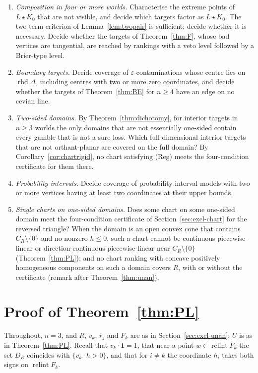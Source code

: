 \documentclass[11pt]{article}
\newcommand{\one}{\mathbf{1}}
\DeclareMathOperator{\conv}{conv}
\DeclareMathOperator{\relint}{relint}
\DeclareMathOperator{\rbd}{rbd}
\theoremstyle{plain}
\theoremstyle{definition}
\theoremstyle{remark}
\begin{document}
\begin{enumerate}[label=(\arabic*)]
  and $\conv\{\frac1{11}(6,4,1),\frac1{10}(6,1,3),\frac18(6,1,1)\}$, with two.
  \item \emph{Composition in four or more worlds.} Characterise the extreme points of
  $L\star K_0$ that are not visible, and decide which targets factor as $L\star K_0$. The
  two-term criterion of Lemma~\ref{lem:twopair} is sufficient; decide whether it is
  necessary. Decide
  whether the targets of Theorem~\ref{thm:F}, whose bad vertices are tangential, are
  reached by rankings with a veto level followed by a Brier-type level.
  \item \emph{Boundary targets.} Decide coverage of $\varepsilon$-contaminations whose centre
  lies on $\rbd\Delta$, including centres with two or more zero coordinates, and decide
  whether the targets of Theorem~\ref{thm:BE} for $n\ge4$ have an edge on no cevian line.
  \item \emph{Two-sided domains.} By Theorem~\ref{thm:dichotomy}, for interior targets in
  $n\ge3$ worlds the only domains that are not essentially one-sided contain every gamble
  that is not a sure loss. Which full-dimensional interior targets
  that are not orthant-planar are covered on the full domain? By
  Corollary~\ref{cor:chartrigid}, no chart satisfying (Reg) meets the four-condition
  certificate for them there.
  \item \emph{Probability intervals.} Decide coverage of probability-interval models with
  two or more vertices having at least two coordinates at their upper bounds.
  \item \emph{Single charts on one-sided domains.} Does some chart on some one-sided domain
  meet the four-condition certificate of Section~\ref{sec:excl-chart} for the reversed
  triangle? When the domain is an open convex cone that contains $C_R\setminus\{0\}$ and
  no nonzero $h\le0$, such a chart cannot be continuous piecewise-linear or
  direction-continuous piecewise-linear near $C_R\setminus\{0\}$ (Theorem~\ref{thm:PL});
  and no chart ranking with concave positively homogeneous components on such a domain
  covers $R$, with or without the certificate (remark after Theorem~\ref{thm:unan}).
\end{enumerate}

\appendix

\section{Proof of Theorem~\ref{thm:PL}}\label{app:PL}

Throughout, $n=3$, and $R$, $v_k$, $r_j$ and $F_k$ are as in Section~\ref{sec:excl-unan};
$U$ is as in Theorem~\ref{thm:PL}. Recall that $v_k\cdot\one=1$, that near a point $w\in
\relint F_k$ the set $D_R$ coincides with $\{v_k\cdot h>0\}$, and that for $i\ne k$ the
coordinate $h_i$ takes both signs on $\relint F_k$.
\end{document}
